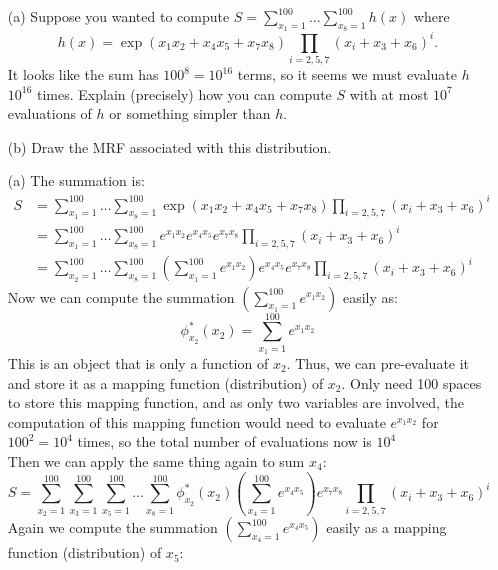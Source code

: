 \documentclass[11pt]{article}
\begin{document}
\begin{enumerate}
\item[(a)] Suppose you wanted to compute $S = \sum^{100}_{x_1 = 1} \dots \sum^{100}_{x_8 = 1} h(x)$ where
\begin{equation*}
    h(x) = \exp(x_1 x_2 + x_4 x_5 + x_7 x_8) \prod_{i=2,5,7} (x_i + x_3 + x_6)^i.
\end{equation*}
It looks like the sum has $100^8 = 10^{16}$ terms, so it seems we must evaluate $h$ $10^{16}$ times. Explain (precisely) how you can compute $S$ with at most $10^7$ evaluations of $h$ or something simpler than $h$.

\item[(b)] Draw the MRF associated with this distribution.
\end{enumerate}

\begin{answertext}{24cm}{}
\begin{enumerate}
\item[(a)] The summation is:
\begin{align*}
S &= \sum^{100}_{x_1 = 1} \dots \sum^{100}_{x_8 = 1} \exp(x_1 x_2 + x_4 x_5 + x_7 x_8) \prod_{i=2,5,7} (x_i + x_3 + x_6)^i\\
&= \sum^{100}_{x_1 = 1} \dots \sum^{100}_{x_8 = 1} e^{x_1 x_2} e^{x_4 x_5} e^{x_7 x_8} \prod_{i=2,5,7} (x_i + x_3 + x_6)^i\\
&= \sum^{100}_{x_2 = 1} \dots \sum^{100}_{x_8 = 1} \left(\sum^{100}_{x_1 = 1} e^{x_1 x_2} \right) e^{x_4 x_5} e^{x_7 x_8} \prod_{i=2,5,7} (x_i + x_3 + x_6)^i
\end{align*}
Now we can compute the summation $\left(\sum^{100}_{x_1 = 1} e^{x_1 x_2} \right)$ easily as:
$$\phi^*_{x_2}(x_2) = \sum^{100}_{x_1 = 1} e^{x_1 x_2}$$
This is an object that is only a function of $x_2$. Thus, we can pre-evaluate it and store it as a mapping function (distribution) of $x_2$. Only need 100 spaces to store this mapping function, and as only two variables are involved, the computation of this mapping function would need to evaluate $e^{x_1 x_2}$ for $100^2=10^4$ times, so the total number of evaluations now is $10^4$\\
Then we can apply the same thing again to sum $x_4$:
$$S = \sum^{100}_{x_2 = 1} \sum^{100}_{x_3 = 1}\sum^{100}_{x_5 = 1}\dots\sum^{100}_{x_8 = 1}\phi^*_{x_2}(x_2) \left(\sum^{100}_{x_4 = 1} e^{x_4 x_5} \right) e^{x_7 x_8} \prod_{i=2,5,7} (x_i + x_3 + x_6)^i$$
Again we compute the summation $\left(\sum^{100}_{x_4 = 1} e^{x_4 x_5}\right)$ easily as a mapping function (distribution) of $x_5$:

\end{enumerate}
\end{answertext}
\end{document}
